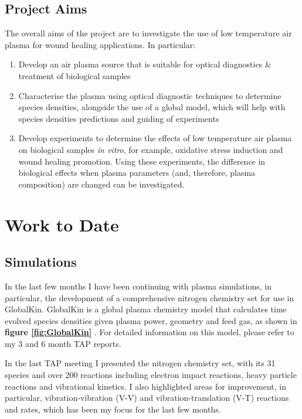 \documentclass[11pt, oneside]{article}   	%
\begin{document}
\subsection{Project Aims}
The overall aims of the project are to investigate the use of low temperature air plasma for wound healing applications. In particular:
\begin{enumerate}
\item Develop an air plasma source that is suitable for optical diagnostics \& treatment of biological samples
\item Characterise the plasma using optical diagnostic techniques to determine species densities, alongside the use of a global model, which will help with species densities predictions and guiding of experiments
\item Develop experiments to determine the effects of low temperature air plasma on biological samples \textit{in vitro}, for example, oxidative stress induction and wound healing promotion. Using these experiments, the difference in biological effects when plasma parameters (and, therefore, plasma composition) are changed can be investigated.
\end{enumerate}


\section{Work to Date}
\subsection{Simulations}
In the last few months I have been continuing with plasma simulations, in particular, the development of a comprehensive nitrogen chemistry set for use in GlobalKin.
GlobalKin is a global plasma chemistry model that calculates time evolved species densities given plasma power, geometry and feed gas, as shown in \textbf{figure \ref{fig:GlobalKin}} \cite{Stafford2004O2}.
For detailed information on this model, please refer to my 3 and 6 month TAP reports.

In the last TAP meeting I presented the nitrogen chemistry set, with its 31 species and over 200 reactions including electron impact reactions, heavy particle reactions and vibrational kinetics.
I also highlighted areas for improvement, in particular, vibration-vibration (V-V) and vibration-translation (V-T) reactions and rates, which has been my focus for the last few months.
\end{document}
